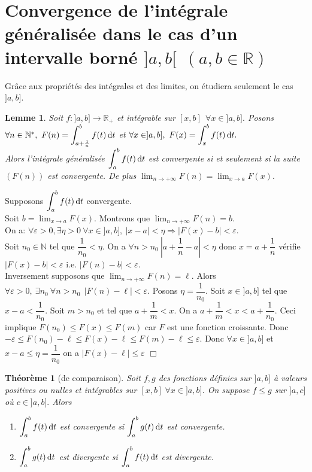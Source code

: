 \documentclass[11pt, a4paper]{book}
\newtheorem{teo}{Th\'eor\`eme}[section]
\newtheorem{lem}{Lemme}[section]
\newenvironment{pr}{\noindent {\bf Preuve} \noindent} {\hfill $\Box$\vskip 5mm}
\begin{document}
\section[Convergence de l'int\'egrale g\'en\'eralis\'ee sur un intervalle born\'e]{Convergence de l'int\'egrale g\'en\'eralis\'ee dans le cas d'un intervalle born\'e $]a,b[ ~~(a,b \in \mathbb{R})$}
Gr\^ace aux propri\'et\'es des int\'egrales et des limites, on \'etudiera seulement le cas $]a,b]$.
\begin{lem} \label{lem3.3.1}
Soit $f:]a,b]\longrightarrow \mathbb{R}_+$ et int\'egrable sur $[x,b]~~\forall x\in ]a,b].$
 Posons $\forall n\in \mathbb{N}^*,~{\displaystyle F(n)=\int_{a+\frac{1}{n}}^b f(t)\,\mathrm{d} t}$ et $\forall x\in ]a,b],~{\displaystyle F(x)=\int_x^b f(t)\,\mathrm{d} t .}$ \\
Alors l'int\'egrale g\'en\'eralis\'ee ${\displaystyle \int_a^b f(t)\, \mathrm{d} t }$ est convergente si et seulement si la suite $(F(n))$ est convergente. 
De plus ${\displaystyle\lim_{n\rightarrow+\infty}F(n)=\lim_{x\rightarrow a}F(x).}$
\end{lem}
\begin{pr}\quad
Supposons ${\displaystyle \int_a^b f(t)\,\mathrm{d} t }$ convergente.\\
Soit ${\displaystyle b=\lim_{x\rightarrow a}F(x).}$ Montrons que ${\displaystyle \lim_{n\rightarrow+\infty}F(n)=b}$.\\
On a: $\forall \varepsilon>0, \exists \eta>0 ~\forall x\in ]a,b],~|x-a|<\eta\Rightarrow |F(x)-b|<\varepsilon.$\\
Soit $n_0\in \mathbb{N}$ tel que $ \dfrac{1}{n_0}<\eta$. On a $\forall n>n_0 ~|a+\dfrac{1}{n}-a|<\eta$ donc $x=a+\dfrac{1}{n}$ v\'erifie $|F(x)-b|<\varepsilon$ i.e. $|F(n)-b|<\varepsilon$. \\
Inversement supposons que ${\displaystyle \lim_{n\rightarrow+\infty}F(n)=\ell.}$ Alors $\forall \varepsilon >0,~\exists n_0 ~\forall n>n_0 ~~|F(n)-\ell|<\varepsilon .$ Posons $\eta=\dfrac{1}{n_0}.$ Soit $x\in]a,b]$ tel que $x-a<\dfrac{1}{n_0}.$ Soit $m>n_0$ et tel que $a+\dfrac{1}{m}<x$. On a $a+\dfrac{1}{m}<x<a+\dfrac{1}{n_0}.$ Ceci implique $F(n_0)\leq F(x)\leq F(m) $ car $F$ est une fonction croissante. Donc $-\varepsilon \leq F(n_0)-\ell\leq F(x)-\ell\leq F(m)-\ell\leq \varepsilon.$ Donc $\forall x\in ]a,b]$ et $x-a\leq \eta =\dfrac{1}{n_0}$ on a $|F(x)-\ell|\leq \varepsilon$ 
\end{pr}
\begin{teo}[de comparaison] \label{teo3.3.1}
Soit $f,g$ des fonctions d\'efinies sur $]a,b]$ \`a valeurs positives ou nulles et int\'egrables sur $[x,b]~\forall x\in ]a,b]$. On suppose $f\leq g$ sur $]a,c]$ o\`u $c\in ]a,b].$ Alors 
\begin{enumerate}
\item[i-] ${\displaystyle \int_a^b f(t)\,\mathrm{d} t}$ est convergente si ${\displaystyle \int_a^b g(t)\,\mathrm{d} t}$ est convergente.
\item[ii-] ${\displaystyle \int_a^b g(t)\, \mathrm{d} t}$ est divergente si ${\displaystyle \int_a^b f(t)\,\mathrm{d} t}$ est divergente.
\end{enumerate}
\end{teo}
\end{document}
